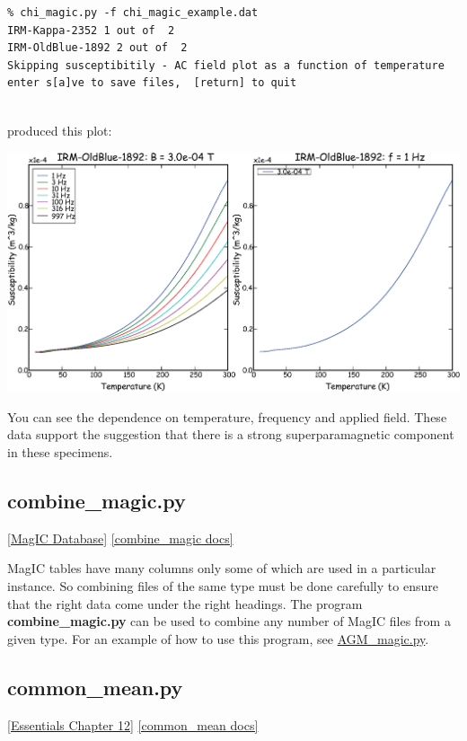 \documentclass[11pt]{book}
\begin{document}
{{\begin{verbatim}
% chi_magic.py -f chi_magic_example.dat
IRM-Kappa-2352 1 out of  2
IRM-OldBlue-1892 2 out of  2
Skipping susceptibitily - AC field plot as a function of temperature
enter s[a]ve to save files,  [return] to quit


\end{verbatim}

\noindent produced this plot:


  \includegraphics[width=15cm]{EPSfiles/chi-magic.eps}

You can see the dependence on temperature, frequency and applied field.  These data support the suggestion that there is a strong superparamagnetic component in these specimens.



\subsection {combine\_magic.py} \href{#MagICDatabase}{[MagIC Database]}
\label{ex:combine_magic}
\href{https://github.com/PmagPy/PmagPy/blob/master/programs/combine_magic.py}{[combine\_magic docs]}

MagIC tables have many columns only some of which are used in a particular instance.  So combining files of the same type must be done carefully to ensure that the right data come under the right headings.  The program {\bf combine\_magic.py} can be used to combine any number of MagIC files from a given type.    For an example of how to use this program, see \href{#AGM_magic.py}{AGM\_magic.py}.





\subsection{common\_mean.py}
\href{http://earthref.org/MAGIC/books/Tauxe/Essentials/WebBook3ch12.html#ch12}{[Essentials Chapter 12]}
\href{https://github.com/PmagPy/PmagPy/blob/master/programs/common_mean.py}{[common\_mean docs]}

}}
\end{document}
